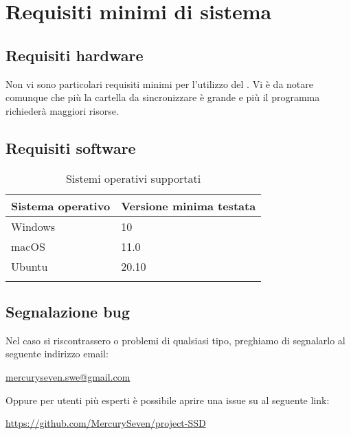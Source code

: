 \section{Requisiti minimi di sistema}

\subsection{Requisiti hardware}

Non vi sono particolari requisiti minimi per l'utilizzo del . Vi è da notare comunque che più la cartella da sincronizzare è grande e più il programma richiederà maggiori risorse.

\subsection{Requisiti software}
{
	\setlength{\freewidth}{\dimexpr\textwidth-1\tabcolsep}
	\renewcommand{\arraystretch}{1.5}
	\setlength{\aboverulesep}{0pt}
	\setlength{\belowrulesep}{0pt}
	\begin{longtable}{L{.210\freewidth} C{.68\freewidth}}
		\textbf{Sistema operativo} & \textbf{Versione minima testata} \\
		\toprule
		\endhead
		Windows & 10 \\
		macOS & 11.0 \\
		Ubuntu & 20.10 \\

		\bottomrule
		\hiderowcolors
		\caption{Sistemi operativi supportati}
	\end{longtable}
}

\subsection{Segnalazione bug}

Nel caso si riscontrassero  o problemi di qualsiasi tipo, preghiamo di segnalarlo al seguente indirizzo email:\newline{}
\centerline{\url{mercuryseven.swe@gmail.com}}
Oppure per utenti più esperti è possibile aprire una issue su  al seguente link:\newline{}
\centerline{\url{https://github.com/MercurySeven/project-SSD}}
